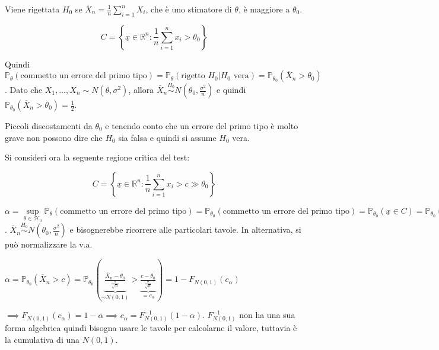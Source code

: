 \documentclass[hidelinks, 10pt]{report}
\begin{document}
\begin{es}
Viene rigettata $ H_0 $ se $ \overline{X}_{n} = \frac{1}{n} \sum\limits_{i = 1}^{n} X_i $, che \`e uno stimatore di $ \theta $, \`e maggiore a $ \theta_0 $. 

\[ C = \left\{ \underline{x} \in \mathbb{R}^{n} : \frac{1}{n} \sum\limits_{i = 1}^{n} x_i > \theta_0 \right\} \]

Quindi $ \mathbb{P}_{\theta} (\text{commetto un errore del primo tipo}) = \mathbb{P}_{\theta} (\text{rigetto } H_{0} \vert H_{0} \text{ vera}) = \mathbb{P}_{\theta_{0}} (\overline{X}_{n} > \theta_{0}) $. Dato che $ X_{1}, \dotsc, X_n \sim N(\theta, \sigma^{2}) $, allora $ \overline{X}_{n} \stackrel{H_0}{\sim} N(\theta_{0}, \frac{\sigma^{2}}{n}) $ e quindi $ \mathbb{P}_{\theta_{0}} (\overline{X}_{n} > \theta_{0}) = \frac{1}{2} $.

Piccoli discostamenti da $ \theta_{0} $ e tenendo conto che un errore del primo tipo \`e molto grave non possono dire che $ H_0 $ sia falsa e quindi si assume $ H_0 $ vera.

Si consideri ora la seguente regione critica del test:

\[ C = \left\{ \underline{x} \in \mathbb{R}^{n} : \frac{1}{n} \sum\limits_{i = 1}^{n} x_i > c \gg \theta_0 \right\} \]

$ \alpha = \sup\limits_{\theta \in \mathcal{H}_0} \mathbb{P}_{\theta} (\text{commetto un errore del primo tipo}) = \mathbb{P}_{\theta_{0}} (\text{commetto un errore del primo tipo}) = \mathbb{P}_{\theta_{0}} (\underline{x} \in C) = \mathbb{P}_{\theta_{0}} (\overline{X}_{n} > c) $. $ \overline{X}_{n} \stackrel{H_{0}}{\sim} N(\theta_{0}, \frac{\sigma^{2}}{n}) $ e bisognerebbe ricorrere alle particolari tavole. In alternativa, si pu\`o normalizzare la v.a.

$ \alpha = \mathbb{P}_{\theta_{0}} (\overline{X}_{n} > c) = \mathbb{P}_{\theta_{0}} \left( \underbrace{\frac{\overline{X}_{n} - \theta_{0}}{\frac{\sigma}{\sqrt{n}}}}_{\sim N(0,1)} > \underbrace{\frac{c - \theta_{0}}{\frac{\sigma}{\sqrt{n}}}}_{= c_{\alpha}} \right) = 1 - F_{N(0,1)} (c_{\alpha}) $

$ \implies F_{N(0,1)} (c_{\alpha}) = 1 - \alpha \implies c_{\alpha} = F^{-1}_{N(0,1)} (1 - \alpha) $. $ F_{N(0,1)}^{-1} $ non ha una sua forma algebrica quindi bisogna usare le tavole per calcolarne il valore, tuttavia \`e la cumulativa di una $ N(0,1) $.

\begin{figure}[H]
\end{figure}
\end{es}
\end{document}
